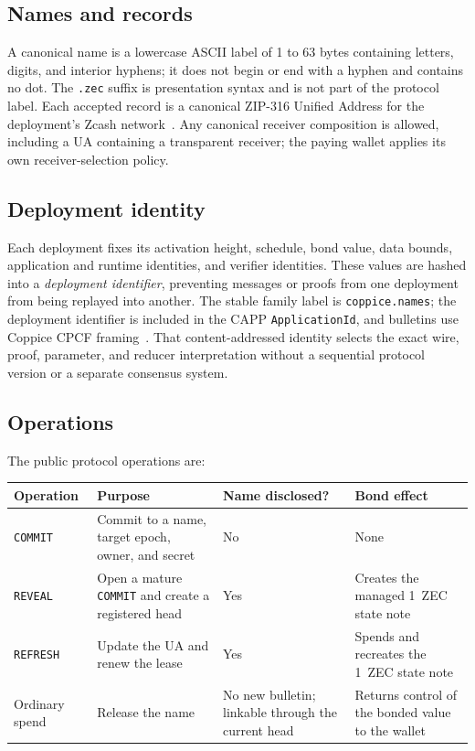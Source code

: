 \documentclass[11pt]{article}
\newcommand{\operation}[1]{\texttt{#1}}
\newcommand{\code}[1]{\texttt{#1}}
\begin{document}
\subsection{Names and records}

A canonical name is a lowercase ASCII label of 1 to 63 bytes containing
letters, digits, and interior hyphens; it does not begin or end with a hyphen
and contains no dot. The \code{.zec} suffix is presentation syntax and is not
part of the protocol label. Each accepted record is a canonical ZIP-316
Unified Address for the deployment's Zcash network~\cite{zip316}. Any
canonical receiver composition is allowed, including a UA containing a
transparent receiver; the paying wallet applies its own receiver-selection
policy.

\subsection{Deployment identity}

Each deployment fixes its activation height, schedule, bond value, data
bounds, application and runtime identities, and verifier identities. These
values are hashed into a \emph{deployment identifier}, preventing messages or
proofs from one deployment from being replayed into another. The stable family
label is \code{coppice.names}; the deployment identifier is included in the
CAPP \code{ApplicationId}, and bulletins use Coppice CPCF
framing~\cite{coppice}. That content-addressed identity selects the exact wire,
proof, parameter, and reducer interpretation without a sequential protocol
version or a separate consensus system.

\subsection{Operations}

The public protocol operations are:

\begin{center}
\small
\begin{tabular}{>{\raggedright\arraybackslash}p{}>{\raggedright\arraybackslash}p{}>{\raggedright\arraybackslash}p{}>{\raggedright\arraybackslash}p{}}
\toprule
Operation & Purpose & Name disclosed? & Bond effect \\
\midrule
\operation{COMMIT} & Commit to a name, target epoch, owner, and secret & No & None \\
\operation{REVEAL} & Open a mature \operation{COMMIT} and create a registered head & Yes & Creates the managed 1~ZEC state note \\
\operation{REFRESH} & Update the UA and renew the lease & Yes & Spends and recreates the 1~ZEC state note \\
Ordinary spend & Release the name & No new bulletin; linkable through the current head & Returns control of the bonded value to the wallet \\
\bottomrule
\end{tabular}
\end{center}
\end{document}
